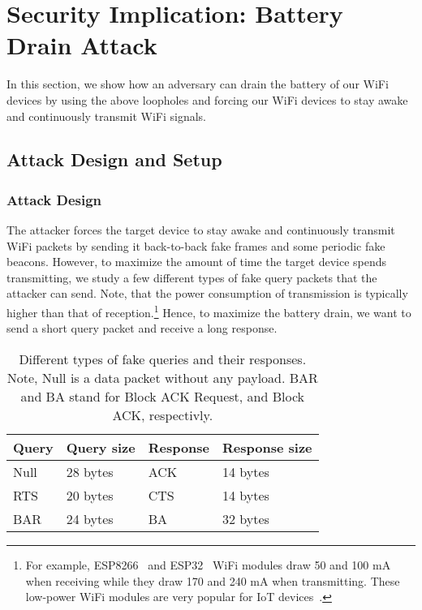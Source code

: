 \section{Security Implication: Battery Drain Attack}
 In this section, we show how an adversary can drain the battery of our WiFi devices by using the above loopholes and forcing our WiFi devices to stay awake and continuously transmit WiFi signals. 


\subsection{Attack Design and Setup}


\subsubsection{Attack Design}
\label{BatteryAttackDesign}
The attacker forces the target device to stay awake and continuously transmit WiFi packets by sending it back-to-back fake frames and some periodic fake beacons. However, to maximize the amount of time the target device spends transmitting, we study a few different types of fake query packets that the attacker can send. 
Note, that the power consumption of transmission is typically higher than that of reception.\footnote{For example, ESP8266~\cite{esp8266} and ESP32~\cite{esp32} WiFi modules draw 50 and 100 mA when receiving while they draw 170 and 240 mA when transmitting.  These low-power WiFi modules are very popular for IoT devices~\cite{abedi2019wi}.} Hence, to maximize the battery drain, we want to send a short query packet and receive a long response.

\begin{table}[h]
    \centering
    \begin{tabular}{|l|l|l|l|}
        \hline
         Query & Query size & Response & Response size \\
         \hline
         Null    &   28 bytes & ACK   &   14 bytes\\
         RTS            &  20 bytes & CTS   &  14 bytes\\
         BAR     &  24 bytes & BA &  32 bytes \\
         \hline
    \end{tabular}
    \caption{Different types of fake queries and their  responses. Note, Null is a data packet without any payload. BAR and BA stand for Block ACK Request, and Block ACK, respectivly.}
    \vspace{-10pt}
    \label{tbl:queries}
\end{table}

